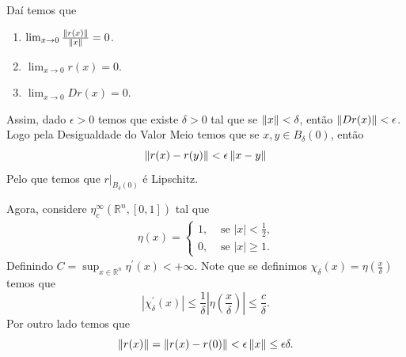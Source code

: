 \begin{frame}{}
  \begin{block}{}
    Daí temos que
    \begin{enumerate}
      \item $\lim_{x \to 0}\frac{\left\|r(x)\right\|}{\left\|x\right\|}=0$.
      \item $\lim_{x \to 0}r(x)=0$.
      \item $\lim_{x \to 0}Dr(x)=0$.
    \end{enumerate}
    Assim, dado $\epsilon>0$ temos que existe $\delta>0$ tal que se $\left\|x\right\|<\delta$, então $\left\|Dr(x)\right\|<\epsilon$. Logo pela Desigualdade do Valor Meio temos que se $x,y\in B_{\delta}(0)$, então
    \begin{equation}\label{eq:r-lip}
      \left\|r(x)-r(y)\right\|<\epsilon\left\|x-y\right\|
    \end{equation}
    Pelo que temos que $r\big|_{B_{\delta}(0)}$ é Lipschitz. 
  \end{block}
\end{frame}

\begin{frame}{}
  \begin{block}{}
    Agora, considere $\eta^{\infty}_c(\mathbb{R}^{n},[0,1])$ tal que
    \begin{align*}
      \eta(x)=\begin{cases}
        1, &\text{ se } |x|<\frac{1}{2} \text{,} \\
        0, &\text{ se } |x|\geq 1.
      \end{cases}
    \end{align*}
    Definindo $C=\sup_{x\in\mathbb{R}^{n}}\eta^{\prime}(x)<+\infty$. Note que se definimos $\chi_{\delta}(x)=\eta\left( \frac{x}{\delta} \right)$ temos que
    \begin{equation}\label{eq:cota-xlinha}
      |\chi_{\delta}^{\prime}(x)|\leq \frac{1}{\delta}\left| \eta\left( \frac{x}{\delta} \right) \right|\leq\frac{c}{\delta}.
    \end{equation}
    Por outro lado temos que
    \begin{equation}\label{eq:cota-rx}
      \left\|r(x)\right\|=\left\|r(x)-r(0)\right\|< \epsilon\left\|x\right\|\leq \epsilon\delta.
    \end{equation}
  \end{block} 
\end{frame}

